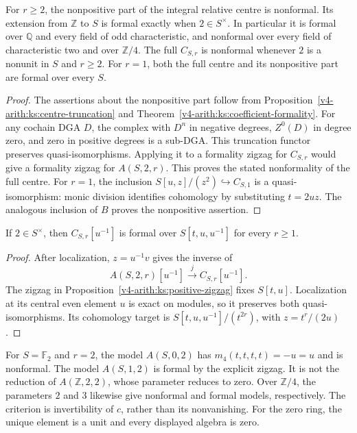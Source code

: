 \begin{corollary}
\label{v4-arith:ks:exceptional-two}
\ClaimStatusProvedHere{}
For $r\geq2$, the nonpositive part of the integral relative centre is nonformal.
Its extension from $\mathbb Z$ to $S$ is formal exactly when $2\in S^\times$.
In particular it is formal over $\mathbb Q$ and every field of odd characteristic,
and nonformal over every field of characteristic two and over $\mathbb Z/4$.
The full $C_{S,r}$ is nonformal whenever $2$ is a nonunit in $S$ and $r\geq2$.
For $r=1$, both the full centre and its nonpositive part are formal over every $S$.
\end{corollary}

\begin{proof}
The assertions about the nonpositive part follow from
Proposition~\ref{v4-arith:ks:centre-truncation} and Theorem~\ref{v4-arith:ks:coefficient-formality}.
For any cochain DGA $D$, the complex with $D^n$ in negative degrees,
$Z^0(D)$ in degree zero, and zero in positive degrees is a sub-DGA.
This truncation functor preserves quasi-isomorphisms.
Applying it to a formality zigzag for $C_{S,r}$ would give a formality
zigzag for $A(S,2,r)$.
This proves the stated nonformality of the full centre.
For $r=1$, the inclusion
$S[u,z]/(z^2)\hookrightarrow C_{S,1}$ is a quasi-isomorphism:
monic division identifies cohomology by substituting $t=2uz$.
The analogous inclusion of $B$ proves the nonpositive assertion.
\end{proof}

\begin{corollary}
\label{v4-arith:ks:centre-localization}
\ClaimStatusProvedHere{}
If $2\in S^\times$, then $C_{S,r}[u^{-1}]$ is formal over
$S[t,u,u^{-1}]$ for every $r\geq1$.
\end{corollary}

\begin{proof}
After localization, $z=u^{-1}v$ gives the inverse of
\[
 A(S,2,r)[u^{-1}]\xrightarrow{\ j\ }C_{S,r}[u^{-1}].
\]
The zigzag in Proposition~\ref{v4-arith:ks:positive-zigzag} fixes $S[t,u]$.
Localization at its central even element $u$ is exact on modules,
so it preserves both quasi-isomorphisms.
Its cohomology target is
$S[t,u,u^{-1}]/(t^{2r})$, with $z=t^r/(2u)$.
\end{proof}

\begin{example}
For $S=\mathbb F_2$ and $r=2$, the model $A(S,0,2)$ has
$m_4(t,t,t,t)=-u=u$ and is nonformal.
The model $A(S,1,2)$ is formal by the explicit zigzag.
It is not the reduction of $A(\mathbb Z,2,2)$, whose parameter reduces to zero.
Over $\mathbb Z/4$, the parameters $2$ and $3$ likewise give
nonformal and formal models, respectively.
The criterion is invertibility of $c$, rather than its nonvanishing.
For the zero ring, the unique element is a unit and every displayed algebra is zero.
\end{example}

